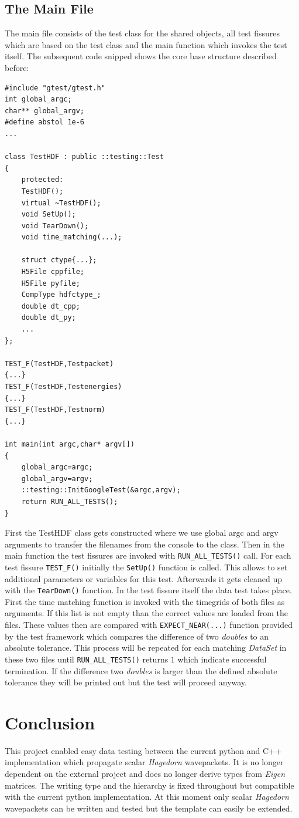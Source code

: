 \section{The Main File}
\label{seq:testmain}
The main file consists of the test class for the shared objects, all test fissures which are based on the test class and the main function which invokes the test itself. The subsequent code snipped shows the core base structure described before:

\begin{lstlisting}
#include "gtest/gtest.h"
int global_argc;
char** global_argv;
#define abstol 1e-6
...

class TestHDF : public ::testing::Test
{
	protected:
	TestHDF();
	virtual ~TestHDF();
	void SetUp();
	void TearDown();
	void time_matching(...);
	
	struct ctype{...};
	H5File cppfile;
	H5File pyfile;
	CompType hdfctype_;
	double dt_cpp;
	double dt_py;
	...
};

TEST_F(TestHDF,Testpacket)
{...}
TEST_F(TestHDF,Testenergies)
{...}
TEST_F(TestHDF,Testnorm)
{...}

int main(int argc,char* argv[])
{
	global_argc=argc;
	global_argv=argv;
	::testing::InitGoogleTest(&argc,argv);
	return RUN_ALL_TESTS();
}
\end{lstlisting}
First the TestHDF class gets constructed where we use global argc and argv arguments to transfer the filenames from the console to the class. Then in the main function the test fissures are invoked with \texttt{RUN\_ALL\_TESTS()} call. For each test fissure \texttt{TEST\_F()} initially the \texttt{SetUp()} function is called. This allows to set additional parameters or variables for this test. Afterwards it gets cleaned up with the \texttt{TearDown()} function. In the test fissure itself the data test takes place. First the time matching function is invoked with the timegrids of both files as arguments. If this list is not empty than the correct values are loaded from the files. These values then are compared with \texttt{EXPECT\_NEAR(...)} function provided by the test framework which compares the difference of two \textit{doubles} to an absolute tolerance. This process will be repeated for each matching \textit{DataSet} in these two files until \texttt{RUN\_ALL\_TESTS()} returns $1$ which indicate successful termination. If the difference two \textit{doubles} is larger than the defined absolute tolerance they will be printed out but the test will proceed anyway.

\chapter{Conclusion}
This project enabled easy data testing between the current python and C++ implementation which propagate scalar \textit{Hagedorn} wavepackets. It is no longer dependent on the external project \cite{eigen3-hdf5} and does no longer derive types from \textit{Eigen} matrices. The writing type and the hierarchy is fixed throughout but compatible with the current python implementation. At this moment only scalar \textit{Hagedorn} wavepackets can be written and tested but the template can easily be extended.